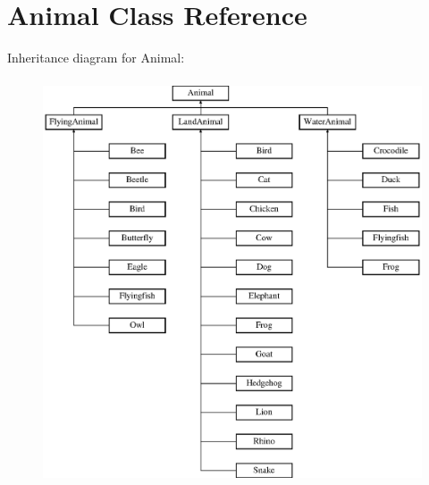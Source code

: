\hypertarget{classAnimal}{\section{Animal Class Reference}
\label{classAnimal}
}
Inheritance diagram for Animal\-:\begin{figure}[H]
\begin{center}
\leavevmode
\includegraphics[height=12.000000cm]{classAnimal}
\end{center}
\end{figure}
